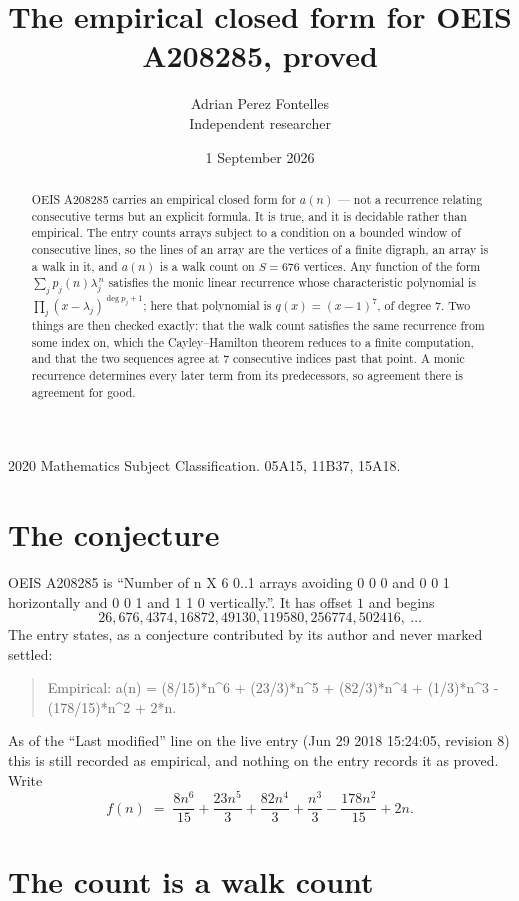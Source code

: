 \documentclass[11pt,a4paper]{article}
\title{The empirical closed form for OEIS A208285, proved}
\author{Adrian Perez Fontelles\\ \small Independent researcher}
\date{1 September 2026}
\theoremstyle{plain}
\theoremstyle{definition}
\begin{document}
\maketitle

\begin{abstract}
OEIS A208285 carries an empirical closed form for $a(n)$ --- not a recurrence relating
consecutive terms but an explicit formula. It is true, and it is decidable rather than
empirical. The entry counts arrays subject to a condition on a bounded window of consecutive lines, so the lines of an array are the
vertices of a finite digraph, an array is a walk in it, and $a(n)$ is a walk count on
$S=676$ vertices. Any function of the form $\sum_j p_j(n)\lambda_j^{\,n}$ satisfies the
monic linear recurrence whose characteristic polynomial is
$\prod_j(x-\lambda_j)^{\deg p_j+1}$; here that polynomial is $q(x)=(x-1)^{7}$, of degree
$7$. Two things are then checked exactly: that the walk count satisfies the same
recurrence from some index on, which the Cayley--Hamilton theorem reduces to a finite
computation, and that the two sequences agree at $7$ consecutive indices past that
point. A monic recurrence determines every later term from its predecessors, so agreement
there is agreement for good.
\end{abstract}

\noindent\small 2020 Mathematics Subject Classification. 05A15, 11B37, 15A18.\normalsize

\section{The conjecture}

OEIS A208285 is ``Number of n X 6 0..1 arrays avoiding 0 0 0 and 0 0 1 horizontally and 0 0 1 and 1 1 0 vertically.''. It has offset $1$ and begins
\[
26, 676, 4374, 16872, 49130, 119580, 256774, 502416,\ \dots
\]
The entry states, as a conjecture contributed by its author and never marked settled:
\begin{quote}
Empirical: a(n) = (8/15)*n\^{}6 + (23/3)*n\^{}5 + (82/3)*n\^{}4 + (1/3)*n\^{}3 - (178/15)*n\^{}2 + 2*n.
\end{quote}
As of the ``Last modified'' line on the live entry (Jun 29 2018 15:24:05, revision 8) this is still
recorded as empirical, and nothing on the entry records it as proved. Write
\[
f(n)\;=\;\frac{8 n^{6}}{15} + \frac{23 n^{5}}{3} + \frac{82 n^{4}}{3} + \frac{n^{3}}{3} - \frac{178 n^{2}}{15} + 2 n.
\]

\section{The count is a walk count}
\end{document}
